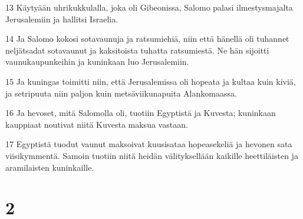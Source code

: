 \par 13 Käytyään uhrikukkulalla, joka oli Gibeonissa, Salomo palasi ilmestysmajalta Jerusalemiin ja hallitsi Israelia.
\par 14 Ja Salomo kokosi sotavaunuja ja ratsumiehiä, niin että hänellä oli tuhannet neljätsadat sotavaunut ja kaksitoista tuhatta ratsumiestä. Ne hän sijoitti vaunukaupunkeihin ja kuninkaan luo Jerusalemiin.
\par 15 Ja kuningas toimitti niin, että Jerusalemissa oli hopeata ja kultaa kuin kiviä, ja setripuuta niin paljon kuin metsäviikunapuita Alankomaassa.
\par 16 Ja hevoset, mitä Salomolla oli, tuotiin Egyptistä ja Kuvesta; kuninkaan kauppiaat noutivat niitä Kuvesta maksua vastaan.
\par 17 Egyptistä tuodut vaunut maksoivat kuusisataa hopeasekeliä ja hevonen sata viisikymmentä. Samoin tuotiin niitä heidän välityksellään kaikille heettiläisten ja aramilaisten kuninkaille.

\chapter{2}


